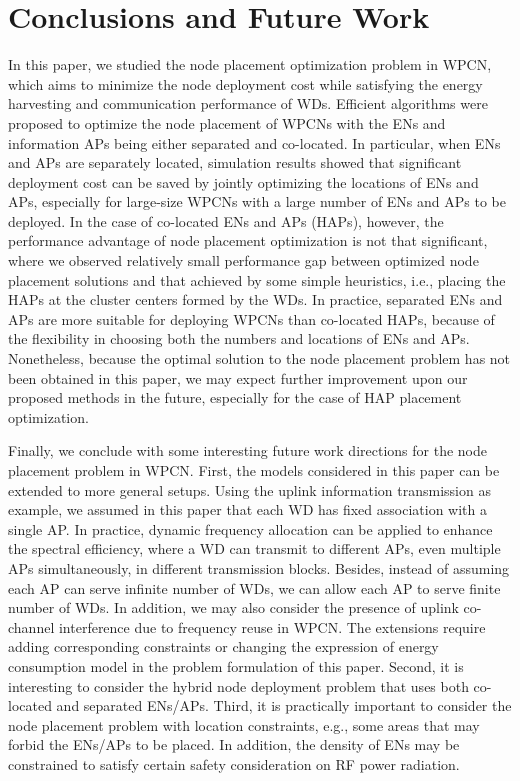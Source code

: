 \documentclass[journal, draftcls, one column, 12pt]{IEEEtran}
\begin{document}
\section{Conclusions and Future Work}
In this paper, we studied the node placement optimization problem in WPCN, which aims to minimize the node deployment cost while satisfying the energy harvesting and communication performance of WDs. Efficient algorithms were proposed to optimize the node placement of WPCNs with the ENs and information APs being either separated and co-located. In particular, when ENs and APs are separately located, simulation results showed that significant deployment cost can be saved by jointly optimizing the locations of ENs and APs, especially for large-size WPCNs with a large number of ENs and APs to be deployed. In the case of co-located ENs and APs (HAPs), however, the performance advantage of node placement optimization is not that significant, where we observed relatively small performance gap between optimized node placement solutions and that achieved by some simple heuristics, i.e., placing the HAPs at the cluster centers formed by the WDs. In practice, separated ENs and APs are more suitable for deploying WPCNs than co-located HAPs, because of the flexibility in choosing both the numbers and locations of ENs and APs. Nonetheless, because the optimal solution to the node placement problem has not been obtained in this paper, we may expect further improvement upon our proposed methods in the future, especially for the case of HAP placement optimization.

Finally, we conclude with some interesting future work directions for the node placement problem in WPCN. First, the models considered in this paper can be extended to more general setups. Using the uplink information transmission as example, we assumed in this paper that each WD has fixed association with a single AP. In practice, dynamic frequency allocation can be applied to enhance the spectral efficiency, where a WD can transmit to different APs, even multiple APs simultaneously, in different transmission blocks. Besides, instead of assuming each AP can serve infinite number of WDs, we can allow each AP to serve finite number of WDs. In addition, we may also consider the presence of uplink co-channel interference due to frequency reuse in WPCN. The extensions require adding corresponding constraints or changing the expression of energy consumption model in the problem formulation of this paper. Second, it is interesting to consider the hybrid node deployment problem that uses both co-located and separated ENs/APs. Third, it is practically important to consider the node placement problem with location constraints, e.g., some areas that may forbid the ENs/APs to be placed. In addition, the density of ENs may be constrained to satisfy certain safety consideration on RF power radiation.
\end{document}
